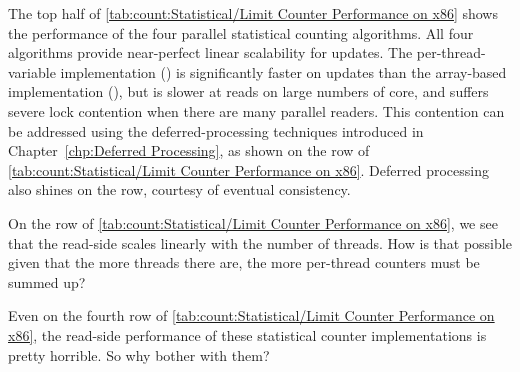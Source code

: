The top half of \cref{tab:count:Statistical/Limit Counter Performance on x86}
shows the performance of the four parallel statistical counting
algorithms.
All four algorithms provide near-perfect linear scalability for updates.
The per-thread-variable implementation ()
is significantly faster on
updates than the array-based implementation
(), but is slower at reads on large numbers of core,
and suffers severe lock contention when there are many parallel readers.
This contention can be addressed using the deferred-processing
techniques introduced in
Chapter~\ref{chp:Deferred Processing},
as shown on the  row of
\cref{tab:count:Statistical/Limit Counter Performance on x86}.
Deferred processing also shines on the  row,
courtesy of eventual consistency.

\QuickQuiz{}
	On the  row of
	\cref{tab:count:Statistical/Limit Counter Performance on x86},
	we see that the read-side scales linearly with the number of
	threads.
	How is that possible given that the more threads there are,
	the more per-thread counters must be summed up?
 \QuickQuizEnd

\QuickQuiz{}
	Even on the fourth row of
	\cref{tab:count:Statistical/Limit Counter Performance on x86},
	the read-side performance of these statistical counter
	implementations is pretty horrible.
	So why bother with them?
 \QuickQuizEnd

